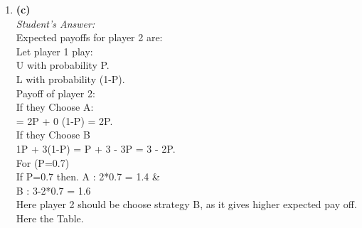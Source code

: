 \documentclass[a4paper,12pt]{article}
\begin{document}
\begin{enumerate}
\begin{enumerate}
        \item \textbf{(c)} \\
        \textit{Student's Answer:} \\
        Expected payoffs for player 2 are: \\
        Let player 1 play: \\
        U with probability P. \\
        L with probability (1-P). \\
        Payoff of player 2: \\
        If they Choose A: \\
        = 2P + 0 (1-P) = 2P. \\
        If they Choose B \\
        1P + 3(1-P) = P + 3 - 3P = 3 - 2P. \\
        For (P=0.7) \\
        If P=0.7 then. A : 2*0.7 = 1.4 \& \\
        B : 3-2*0.7 = 1.6 \\
        Here player 2 should be choose strategy B, as it gives higher expected pay off. \\
        Here the Table.
    \end{enumerate}


\end{enumerate}
\end{document}
